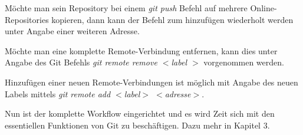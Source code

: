 \begin{INFO}
  Möchte man sein Repository bei einem \textit{git push} Befehl auf mehrere Online-Repositories kopieren, dann kann der Befehl zum hinzufügen wiederholt werden unter Angabe einer weiteren Adresse.
\end{INFO}

Möchte man eine komplette Remote-Verbindung entfernen, kann dies unter Angabe des Git Befehls \textit{git remote remove  $ < $label $ > $} vorgenommen werden. 
  
Hinzufügen einer neuen Remote-Verbindungen ist möglich mit Angabe des neuen Labels mittels \textit{git remote add $ < $label$ > $ $ < $adresse$ > $}.

Nun ist der komplette Workflow eingerichtet und es wird Zeit sich mit den essentiellen Funktionen von Git zu beschäftigen. Dazu mehr in Kapitel 3.
